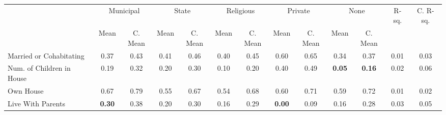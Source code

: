 \begin{tabular}{l c c c c c c c c c c c c}
\toprule
& \multicolumn{2}{c}{Municipal} & \multicolumn{2}{c}{State} & \multicolumn{2}{c}{Religious} & \multicolumn{2}{c}{Private} & \multicolumn{2}{c}{None} & R-sq. & C. R-sq. \\
& \scriptsize Mean & \scriptsize C. Mean & \scriptsize Mean & \scriptsize C. Mean & \scriptsize Mean & \scriptsize C. Mean & \scriptsize Mean & \scriptsize C. Mean & \scriptsize Mean & \scriptsize C. Mean & & \\
\midrule
Married or Cohabitating &      0.37 & 0.43 &      0.41 & 0.46 &      0.40 & 0.45 &      0.60 & 0.65 &      0.34 & 0.37 &      0.01 &      0.03 \\
Num. of Children in House &      0.19 & 0.32 &      0.20 & 0.30 &      0.10 & 0.20 &      0.40 & 0.49 & \textbf{     0.05} & \textbf{     0.16} &      0.02 &      0.06 \\
Own House &      0.67 & 0.79 &      0.55 & 0.67 &      0.54 & 0.68 &      0.60 & 0.71 &      0.59 & 0.72 &      0.01 &      0.02 \\
Live With Parents & \textbf{     0.30} & 0.38 &      0.20 & 0.30 &      0.16 & 0.29 & \textbf{     0.00} & 0.09 &      0.16 & 0.28 &      0.03 &      0.05 \\
\bottomrule
\end{tabular}
